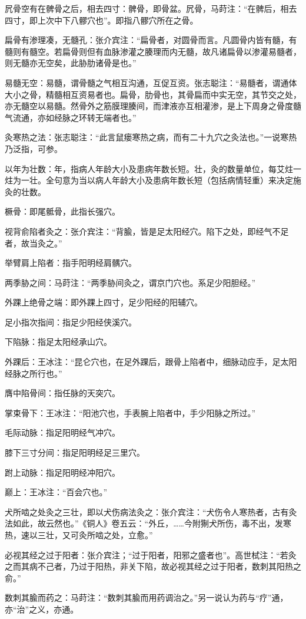 \documentclass[12pt]{ctexbook}%
\begin{document}
\begin{jiaozhu}
	\item 凥骨空有在髀骨之后，相去四寸：髀骨，即骨盆。凥骨，马莳注：“在髀后，相去四寸，即上次中下八髎穴也”。即指八髎穴所在之骨。
	\item 扁骨有渗理凑，无髓孔：张介宾注：“扁骨者，对圆骨而言。凡圆骨内皆有髓，有髓则有髓空。若扁骨则但有血脉渗灌之腠理而内无髓，故凡诸扁骨以渗灌易髓者，则无髓亦无空矣，此胁肋诸骨是也。”
	\item 易髓无空：易髓，谓骨髓之气相互沟通，互促互资。张志聪注：“易髓者，谓通体大小之骨，精髓相互资易者也。扁骨，肋骨也，其骨扁而中实无空，其节交之处，亦无髓空以易髓。然骨外之筋膜理腠间，而津液亦互相灌渗，是上下周身之骨度髓气流通，亦如经脉之环转无端者也。”
	\item 灸寒热之法：张志聪注：“此言鼠瘘寒热之病，而有二十九穴之灸法也。”一说寒热乃泛指，可参。
	\item 以年为壮数：年，指病人年龄大小及患病年数长短。壮，灸的数量单位，每艾炷一炷为一壮。全句意为当以病人年龄大小及患病年数长短（包括病情轻重）来决定施灸的壮数。
	\item 橛骨：即尾骶骨，此指长强穴。
	\item 视背俞陷者灸之：张介宾注：“背腧，皆是足太阳经穴。陷下之处，即经气不足者，故当灸之。”
	\item 举臂肩上陷者：指手阳明经肩髃穴。
	\item 两季胁之间：马莳注：“两季胁间灸之，谓京门穴也。系足少阳胆经。”
	\item 外踝上绝骨之端：即外踝上四寸，足少阳经的阳辅穴。
	\item 足小指次指间：指足少阳经侠溪穴。
	\item 下陷脉：指足太阳经承山穴。
	\item 外踝后：王冰注：“昆仑穴也，在足外踝后，跟骨上陷者中，细脉动应手，足太阳经脉之所行也。”
	\item 膺中陷骨间：指任脉的天突穴。
	\item 掌束骨下：王冰注：“阳池穴也，手表腕上陷者中，手少阳脉之所过。”
	\item 毛际动脉：指足阳明经气冲穴。
	\item 膝下三寸分间：指足阳明经足三里穴。
	\item 跗上动脉：指足阳明经冲阳穴。
	\item 巅上：王冰注：“百会穴也。”
	\item 犬所啮之处灸之三壮，即以犬伤病法灸之：张介宾注：“犬伤令人寒热者，古有灸法如此，故云然也。”《铜人》卷五云：“外丘，……今附猘犬所伤，毒不出，发寒热，速以三壮，又可灸所啮之处，立愈。”
	\item 必视其经之过于阳者：张介宾注；“过于阳者，阳邪之盛者也”。高世栻注：“若灸之而其病不己者，乃过于阳热，非关下陷，故必视其经之过于阳者，数刺其阳热之俞。”
	\item 数刺其腧而药之：马莳注：“数刺其腧而用药调治之。”另一说认为药与“疗”通，亦“治”之义，亦通。
\end{jiaozhu}
\end{document}
